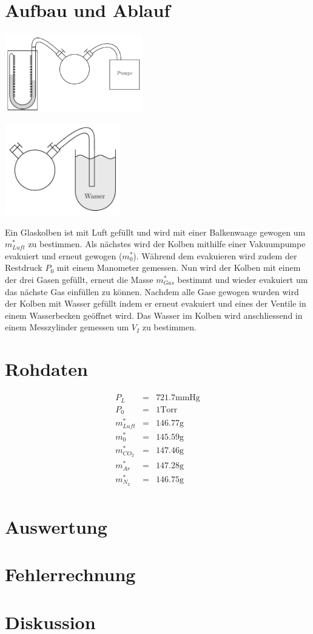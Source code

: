 \documentclass[12pt,a4paper]{article}
\begin{document}
\section*{Aufbau und Ablauf}
\begin{multicols}{2}
\includegraphics[width=6cm]{vakuum.pdf}

\includegraphics[width=5cm]{wasser.pdf}
\end{multicols}

\noindent
Ein Glaskolben ist mit Luft gefüllt und wird mit einer Balkenwaage gewogen um $m^*_{Luft}$ zu bestimmen. Als nächstes wird der Kolben mithilfe einer Vakuumpumpe evakuiert und erneut gewogen ($m^*_0$). Während dem evakuieren wird zudem der Restdruck $P_0$ mit einem Manometer gemessen. Nun wird der Kolben mit einem der drei Gasen gefüllt, erneut die Masse $m^*_{Gas}$ bestimmt und wieder evakuiert um das nächste Gas einfüllen zu können. Nachdem alle Gase gewogen wurden wird der Kolben mit Wasser gefüllt indem er erneut evakuiert und eines der Ventile in einem Wasserbecken geöffnet wird. Das Wasser im Kolben wird anschliessend in einem Messzylinder gemessen um $V_I$ zu bestimmen.

\section*{Rohdaten}
\begin{eqnarray*}
P_L & = & 721.7 \mbox{mmHg} \\
P_0 & = & 1 \mbox{Torr} \\
m^*_{Luft} & = & 146.77 \mbox{g} \\
m^*_{0} & = & 145.59 \mbox{g} \\
m^*_{CO_2} & = & 147.46 \mbox{g} \\
m^*_{Ar} & = & 147.28 \mbox{g} \\
m^*_{N_2} & = & 146.75\mbox{g} \\
\end{eqnarray*}


\section*{Auswertung}


\section*{Fehlerrechnung}


\section*{Diskussion}
\end{document}
